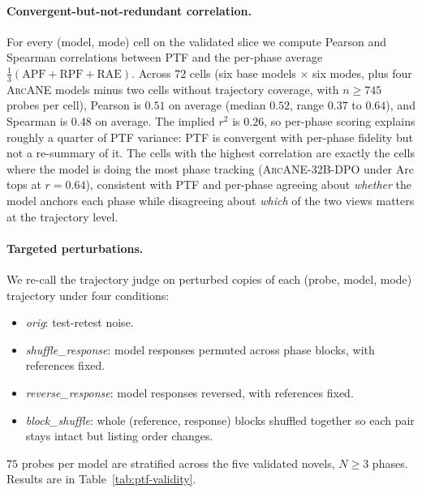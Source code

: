 \documentclass{llmxive}
\providecommand{\ours}{\textsc{ArcANE}}
\begin{document}
\paragraph{Convergent-but-not-redundant correlation.} For every (model, mode) cell on the validated slice we compute Pearson and Spearman correlations between PTF and the per-phase average $\frac{1}{3}(\text{APF}+\text{RPF}+\text{RAE})$. Across $72$ cells (six base models $\times$ six modes, plus four \ours{} models minus two cells without trajectory coverage, with $n\ge 745$ probes per cell), Pearson is $0.51$ on average (median $0.52$, range $0.37$ to $0.64$), and Spearman is $0.48$ on average. The implied $r^2$ is $0.26$, so per-phase scoring explains roughly a quarter of PTF variance: PTF is convergent with per-phase fidelity but not a re-summary of it. The cells with the highest correlation are exactly the cells where the model is doing the most phase tracking (\ours{}-32B-DPO under Arc tops at $r{=}0.64$), consistent with PTF and per-phase agreeing about \emph{whether} the model anchors each phase while disagreeing about \emph{which} of the two views matters at the trajectory level.

\paragraph{Targeted perturbations.} We re-call the trajectory judge on perturbed copies of each (probe, model, mode) trajectory under four conditions:
\begin{itemize}
\setlength{\itemsep}{1pt}
\item \emph{orig}: test-retest noise.
\item \emph{shuffle\_response}: model responses permuted across phase blocks, with references fixed.
\item \emph{reverse\_response}: model responses reversed, with references fixed.
\item \emph{block\_shuffle}: whole (reference, response) blocks shuffled together so each pair stays intact but listing order changes.
\end{itemize}
$75$ probes per model are stratified across the five validated novels, $N{\geq}3$ phases. Results are in Table~\ref{tab:ptf-validity}.
\end{document}
